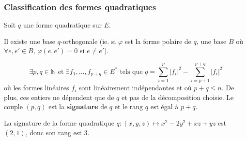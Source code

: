   \subsubsection{Classification des formes quadratiques}


  Soit $q$ une forme quadratique sur $E$.

  \begin{lemma}
    Il existe une base $q$-orthogonale (ie. si $\varphi$ est la forme polaire de $q$, une base $B$ où $\forall e, e' \in B, \, \varphi(e, e') = 0$ si $e \neq e'$).
  \end{lemma}


  \begin{theorem}
    \[ \exists p, q \in \mathbb{N} \text{ et } \exists f_1, \dots, f_{p+q} \in E^* \text{ tels que } q = \sum_{i=1}^p |f_i|^2 - \sum_{i=p+1}^{p+q} |f_i|^2 \]
    où les formes linéaires $f_i$ sont linéairement indépendantes et où $p + q \leq n$. De plus, ces entiers ne dépendent que de $q$ et pas de la décomposition choisie.
    \newpar
    Le couple $(p,q)$ est la \textbf{signature} de $q$ et le rang $q$ est égal à $p+q$.
  \end{theorem}

  \begin{example}
    La signature de la forme quadratique $q : (x,y,z) \mapsto x^2 - 2y^2 + xz + yz$ est $(2,1)$, donc son rang est $3$.
  \end{example}

